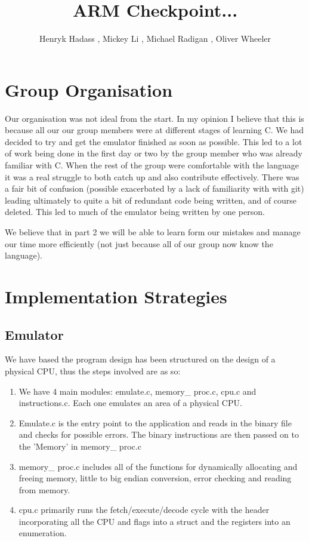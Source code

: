 \documentclass[11pt]{article}
\begin{document}
\title{ARM Checkpoint... }
\author{Henryk Hadass , Mickey Li , Michael Radigan , Oliver Wheeler}

\maketitle

\section{Group Organisation}

Our organisation was not ideal from the start. In my opinion I believe that this is because all our our group members were at different stages of learning C. We had decided to try and get the emulator finished as soon as possible. This led to a lot of work being done in the first day or two by the group member who was already familiar with C. When the rest of the group were comfortable with the language it was a real struggle to both catch up and also contribute effectively. There was a fair bit of confusion (possible exacerbated by a lack of familiarity with with git) leading ultimately to quite a bit of redundant code being written, and of course deleted. This led to much of the emulator being written by one person.

We believe that in part 2 we will be able to learn form our mistakes and manage our time more efficiently (not just because all of our group now know the language). 



\section{Implementation Strategies}
\subsection{Emulator}
We have based the program design has been structured on the design of a physical CPU, thus the steps involved are as so:
\begin{enumerate}
\item
We have 4 main modules: emulate.c, memory\_ proc.c, cpu.c and instructions.c. Each one emulates an area of a physical CPU.

\item
Emulate.c is the entry point to the application and reads in the binary file and checks for possible errors. The binary instructions are then passed on to the 'Memory' in memory\_ proc.c

\item
memory\_ proc.c includes all of the functions for dynamically allocating and freeing memory, little to big endian conversion, error checking and reading from memory.

\item
cpu.c primarily runs the fetch/execute/decode cycle with the header incorporating all the CPU and flags into a struct and the registers into an enumeration. 



\end{enumerate}
\end{document}
